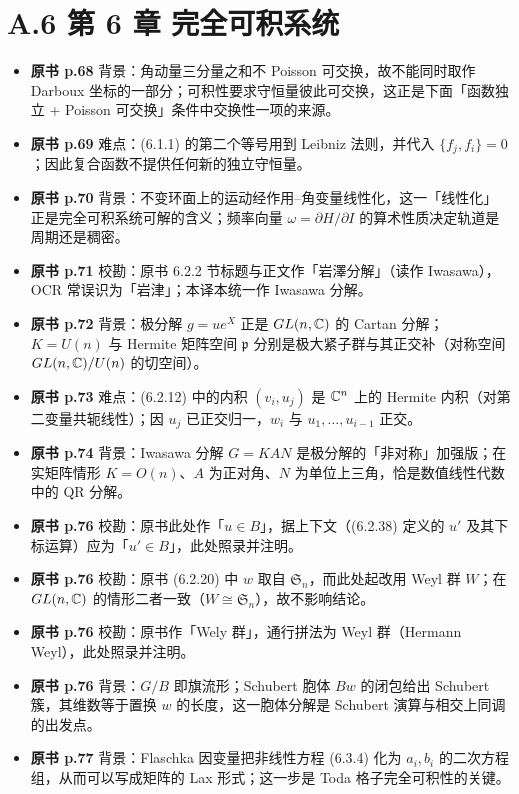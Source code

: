 \section*{A.6 第 6 章 完全可积系统}
\begin{itemize}[leftmargin=2.4em,itemsep=4pt,label={\textbullet}]
\item \textbf{原书 p.68} 背景：角动量三分量之和不 Poisson 可交换，故不能同时取作 Darboux 坐标的一部分；可积性要求守恒量彼此可交换，这正是下面「函数独立 + Poisson 可交换」条件中交换性一项的来源。
\item \textbf{原书 p.69} 难点：(6.1.1) 的第二个等号用到 Leibniz 法则，并代入 $\{f_j,f_i\}=0$；因此复合函数不提供任何新的独立守恒量。
\item \textbf{原书 p.70} 背景：不变环面上的运动经作用–角变量线性化，这一「线性化」正是完全可积系统可解的含义；频率向量 $\omega=\partial H/\partial I$ 的算术性质决定轨道是周期还是稠密。
\item \textbf{原书 p.71} 校勘：原书 6.2.2 节标题与正文作「岩澤分解」（读作 Iwasawa），OCR 常误识为「岩津」；本译本统一作 Iwasawa 分解。
\item \textbf{原书 p.72} 背景：极分解 $g=ue^X$ 正是 $GL(n,\mathbb{C})$ 的 Cartan 分解；$K=U(n)$ 与 Hermite 矩阵空间 $\mathfrak{p}$ 分别是极大紧子群与其正交补（对称空间 $GL(n,\mathbb{C})/U(n)$ 的切空间）。
\item \textbf{原书 p.73} 难点：(6.2.12) 中的内积 $(v_i,u_j)$ 是 $\mathbb{C}^n$ 上的 Hermite 内积（对第二变量共轭线性）；因 $u_j$ 已正交归一，$w_i$ 与 $u_1,\dots,u_{i-1}$ 正交。
\item \textbf{原书 p.74} 背景：Iwasawa 分解 $G=KAN$ 是极分解的「非对称」加强版；在实矩阵情形 $K=O(n)$、$A$ 为正对角、$N$ 为单位上三角，恰是数值线性代数中的 QR 分解。
\item \textbf{原书 p.76} 校勘：原书此处作「$u\in B$」，据上下文（(6.2.38) 定义的 $u'$ 及其下标运算）应为「$u'\in B$」，此处照录并注明。
\item \textbf{原书 p.76} 校勘：原书 (6.2.20) 中 $w$ 取自 $\mathfrak{S}_n$，而此处起改用 Weyl 群 $W$；在 $GL(n,\mathbb{C})$ 的情形二者一致（$W\cong\mathfrak{S}_n$），故不影响结论。
\item \textbf{原书 p.76} 校勘：原书作「Wely 群」，通行拼法为 Weyl 群（Hermann Weyl），此处照录并注明。
\item \textbf{原书 p.76} 背景：$G/B$ 即旗流形；Schubert 胞体 $Bw$ 的闭包给出 Schubert 簇，其维数等于置换 $w$ 的长度，这一胞体分解是 Schubert 演算与相交上同调的出发点。
\item \textbf{原书 p.77} 背景：Flaschka 因变量把非线性方程 (6.3.4) 化为 $a_i,b_i$ 的二次方程组，从而可以写成矩阵的 Lax 形式；这一步是 Toda 格子完全可积性的关键。

\end{itemize}
